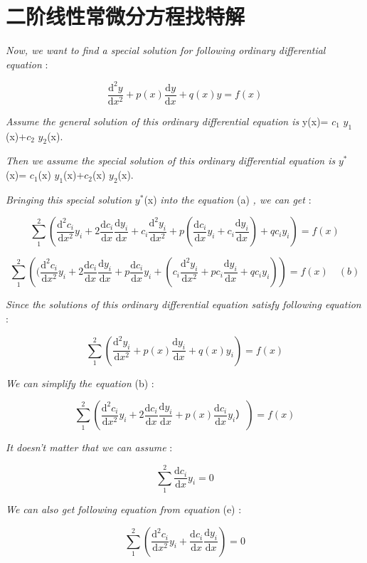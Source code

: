 \section{二阶线性常微分方程找特解}
\textit{Now, we want to find a special solution for following ordinary differential equation} :

\[\frac{\mathrm{d}^2 y}{\mathrm{d} x^2} + p(x) \frac{\mathrm{d} y}{\mathrm{d} x}+q(x)y=f(x) \tag{a} \]

\textit{Assume the general solution of this ordinary differential equation is} y(x)= $c_1$ $y_1$(x)+$c_2$ $y_2$(x).

\textit{Then we assume the special solution of this ordinary differential equation is} $y^*$(x)= $c_1$(x) $y_1$(x)+$c_2$(x) $y_2$(x).

\textit{Bringing this special solution} $y^*$(x) \textit{into the equation} (a) \textit{, we can get} :

\[\sum_{1}^{2} \left (\frac{\mathrm{d}^2 c_i}{\mathrm{d} x^2} y_i +2\frac{\mathrm{d} c_i}{\mathrm{d} x} \frac{\mathrm{d} y_i}{\mathrm{d} x}+ c_i \frac{\mathrm{d}^2 y_i}{\mathrm{d} x^2} + p( \frac{\mathrm{d} c_i}{\mathrm{d} x} y_i + c_i \frac{\mathrm{d} y_i}{\mathrm{d} x})+qc_iy_i \right)=f(x)\]

\[\sum_{1}^{2} \left ( (\frac{\mathrm{d}^2 c_i}{\mathrm{d} x^2} y_i +2\frac{\mathrm{d} c_i}{\mathrm{d} x} \frac{\mathrm{d} y_i}{\mathrm{d} x}+p \frac{\mathrm{d} c_i}{\mathrm{d} x} y_i + (c_i \frac{\mathrm{d}^2 y_i}{\mathrm{d} x^2}+pc_i \frac{\mathrm{d} y_i}{\mathrm{d} x}+qc_iy_i) \right)=f(x) \quad (b) \]

\textit{Since the solutions of this ordinary differential equation satisfy following equation} :

\[\sum_{1}^{2} \left ( \frac{\mathrm{d}^2 y_i}{\mathrm{d} x^2} + p(x) \frac{\mathrm{d} y_i}{\mathrm{d} x}+q(x)y_i \right ) =f(x) \tag{c}\]

\textit{We can simplify the equation} (b) :

\[\sum_{1}^{2} \left(\frac{\mathrm{d}^2 c_i}{\mathrm{d} x^2} y_i +2\frac{\mathrm{d} c_i}{\mathrm{d} x} \frac{\mathrm{d} y_i}{\mathrm{d} x}+p(x) \frac{\mathrm{d} c_i}{\mathrm{d} x} y_i） \right)=f(x) \tag{d} \]

\textit{It doesn't matter that we can assume} :

\[\sum_{1}^{2} \frac{\mathrm{d} c_i}{\mathrm{d} x} y_i =0 \tag{e} \]

\textit{We can also get following equation from equation} (e) :

\[\sum_{1}^{2} \left( \frac{\mathrm{d}^2 c_i}{\mathrm{d} x^2} y_i +\frac{\mathrm{d} c_i}{\mathrm{d} x} \frac{\mathrm{d} y_i}{\mathrm{d} x} \right)=0 \tag{f}\]


